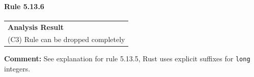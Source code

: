 \paragraph{Rule 5.13.6}
\begin{longtable}{p{13cm}}
\textbf{Analysis Result} \\
(C3) Rule can be dropped completely \\
\end{longtable}
\textbf{Comment:} See explanation for rule 5.13.5, Rust uses explicit suffixes for \texttt{long} integers. \\
